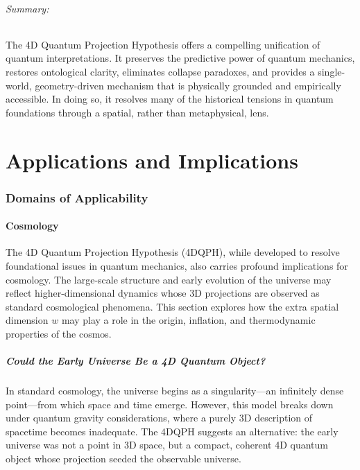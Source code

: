 \documentclass[12pt]{article}
\begin{document}
\paragraph{Summary:}  
The 4D Quantum Projection Hypothesis offers a compelling unification of quantum interpretations. It preserves the predictive power of quantum mechanics, restores ontological clarity, eliminates collapse paradoxes, and provides a single-world, geometry-driven mechanism that is physically grounded and empirically accessible. In doing so, it resolves many of the historical tensions in quantum foundations through a spatial, rather than metaphysical, lens.

\part{Applications and Implications}

\section{Domains of Applicability}

\subsection{Cosmology}

The 4D Quantum Projection Hypothesis (4DQPH), while developed to resolve foundational issues in quantum mechanics, also carries profound implications for cosmology. The large-scale structure and early evolution of the universe may reflect higher-dimensional dynamics whose 3D projections are observed as standard cosmological phenomena. This section explores how the extra spatial dimension \( w \) may play a role in the origin, inflation, and thermodynamic properties of the cosmos.

\subsubsection*{Could the Early Universe Be a 4D Quantum Object?}

In standard cosmology, the universe begins as a singularity—an infinitely dense point—from which space and time emerge. However, this model breaks down under quantum gravity considerations, where a purely 3D description of spacetime becomes inadequate. The 4DQPH suggests an alternative: the early universe was not a point in 3D space, but a compact, coherent 4D quantum object whose projection seeded the observable universe.
\end{document}
